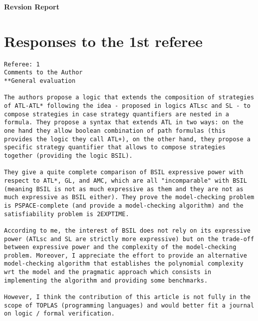 \documentclass[11pt]{article}
\begin{document}
\newpage 
\begin{center} 
\bf\LARGE Revsion Report 
\end{center} 
\section{Responses to the 1st referee} 

\begin{verbatim} 
Referee: 1 
Comments to the Author 
**General evaluation 

The authors propose a logic that extends the composition of strategies 
of ATL-ATL* following the idea - proposed in logics ATLsc and SL - to 
compose strategies in case strategy quantifiers are nested in a 
formula. They propose a syntax that extends ATL in two ways: on the 
one hand they allow boolean combination of path formulas (this 
provides the logic they call ATL+), on the other hand, they propose a 
specific strategy quantifier that allows to compose strategies 
together (providing the logic BSIL). 

They give a quite complete comparison of BSIL expressive power with 
respect to ATL*, GL, and AMC, which are all "incomparable" with BSIL 
(meaning BSIL is not as much expressive as them and they are not as 
much expressive as BSIL either). They prove the model-checking problem 
is PSPACE-complete (and provide a model-checking algorithm) and the 
satisfiability problem is 2EXPTIME. 

According to me, the interest of BSIL does not rely on its expressive 
power (ATLsc and SL are strictly more expressive) but on the trade-off 
between expressive power and the complexity of the model-checking 
problem. Moreover, I appreciate the effort to provide an alternative 
model-checking algorithm that establishes the polynomial complexity 
wrt the model and the pragmatic approach which consists in 
implementing the algorithm and providing some benchmarks. 

However, I think the contribution of this article is not fully in the 
scope of TOPLAS (programming languages) and would better fit a journal 
on logic / formal verification. 
\end{verbatim} 
\end{document}
